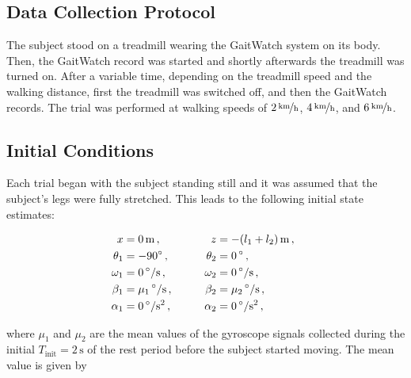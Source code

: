 \subsection{Data Collection Protocol}

The subject stood on a treadmill wearing the GaitWatch system on its body. Then, the GaitWatch record was started and shortly afterwards the treadmill was turned on. After a variable time, depending on the treadmill speed and the walking distance, first the treadmill was switched off, and then the GaitWatch records. The trial was performed at walking speeds of $\unitfrac[2]{km}{h}$, $\unitfrac[4]{km}{h}$, and $\unitfrac[6]{km}{h}$.

\subsection{Initial Conditions}\label{sec:initial_cond}

Each trial began with the subject standing still and it was assumed that the subject's legs were fully stretched. This leads to the following initial state estimates:

\begin{equation}
\begin{matrix}
	\begin{split}
	  x &= 0\,\mbox{m}\,, \\
	  \theta_1 &= -90^{\circ}\,, \\
	  \omega_1 &= 0\, ^{\circ}/\mbox{s} \,, \\
	  \beta_1 &= \mu_1\, ^{\circ}/\mbox{s} \,, \\
	  \alpha_1 &= 0\, ^{\circ}/\mbox{s}^2\,, 
\end{split} \qquad \quad
    \begin{split}
   	  z &= -(l_1+l_2)\,\mbox{m}\,, \\
	  \theta_2 &= 0\,^{\circ}\,, \mathrel{\phantom{90^{\circ}}}\\
	  \omega_2 &= 0\, ^{\circ}/\mbox{s} \,, \\
	  \beta_2 &= \mu_2\, ^{\circ}/\mbox{s} \,, \\
	  \alpha_2 &= 0\, ^{\circ}/\mbox{s}^2\,,  
\end{split}
\end{matrix} \\
\end{equation}

\noindent
where $\mu_1$ and $\mu_2$ are the mean values of the gyroscope signals collected during the initial $T_{\text{init}} = 2\,\mbox{s}$ of the rest period before the subject started moving. The mean value is given by

